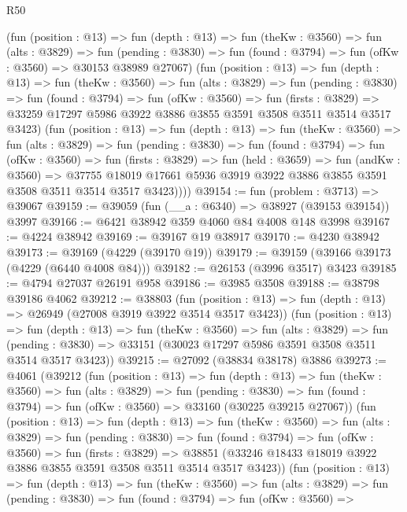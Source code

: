 \begin{lexlean}{R50}
\begin{coremodule}
          (fun (position : @13) =>
          fun (depth : @13) =>
          fun (theKw : @3560) =>
          fun (alts : @3829) =>
          fun (pending : @3830) =>
          fun (found : @3794) => fun (ofKw : @3560) => @30153 @38989 @27067)
          (fun (position : @13) =>
          fun (depth : @13) =>
          fun (theKw : @3560) =>
          fun (alts : @3829) =>
          fun (pending : @3830) =>
          fun (found : @3794) =>
          fun (ofKw : @3560) =>
          fun (firsts : @3829) =>
          @33259 @17297 @5986 @3922 @3886 @3855 @3591 @3508 @3511 @3514 @3517 @3423)
          (fun (position : @13) =>
          fun (depth : @13) =>
          fun (theKw : @3560) =>
          fun (alts : @3829) =>
          fun (pending : @3830) =>
          fun (found : @3794) =>
          fun (ofKw : @3560) =>
          fun (firsts : @3829) =>
          fun (held : @3659) =>
          fun (andKw : @3560) =>
          @37755 @18019 @17661 @5936 @3919 @3922 @3886 @3855 @3591 @3508 @3511 @3514 @3517 @3423))))
@39154 := fun (problem : @3713) => @39067
@39159 := @39059 (fun (__a : @6340) => @38927 (@39153 @39154)) @3997
@39166 := @6421 @38942 @359 @4060 @84 @4008 @148 @3998
@39167 := @4224 @38942
@39169 := @39167 @19 @38917
@39170 := @4230 @38942
@39173 := @39169 (@4229 (@39170 @19))
@39179 := @39159 (@39166 @39173 (@4229 (@6440 @4008 @84)))
@39182 := @26153 (@3996 @3517) @3423
@39185 := @4794 @27037 @26191 @958
@39186 := @3985 @3508
@39188 := @38798 @39186 @4062
@39212 := @38803
    (fun (position : @13) => fun (depth : @13) => @26949 (@27008 @3919 @3922 @3514 @3517 @3423))
    (fun (position : @13) =>
    fun (depth : @13) =>
    fun (theKw : @3560) =>
    fun (alts : @3829) =>
    fun (pending : @3830) => @33151 (@30023 @17297 @5986 @3591 @3508 @3511 @3514 @3517 @3423))
@39215 := @27092 (@38834 @38178) @3886
@39273 := @4061
    (@39212
      (fun (position : @13) =>
      fun (depth : @13) =>
      fun (theKw : @3560) =>
      fun (alts : @3829) =>
      fun (pending : @3830) =>
      fun (found : @3794) => fun (ofKw : @3560) => @33160 (@30225 @39215 @27067))
      (fun (position : @13) =>
      fun (depth : @13) =>
      fun (theKw : @3560) =>
      fun (alts : @3829) =>
      fun (pending : @3830) =>
      fun (found : @3794) =>
      fun (ofKw : @3560) =>
      fun (firsts : @3829) =>
      @38851 (@33246 @18433 @18019 @3922 @3886 @3855 @3591 @3508 @3511 @3514 @3517 @3423))
      (fun (position : @13) =>
      fun (depth : @13) =>
      fun (theKw : @3560) =>
      fun (alts : @3829) =>
      fun (pending : @3830) =>
      fun (found : @3794) =>
      fun (ofKw : @3560) =>

\end{coremodule}
\end{lexlean}
